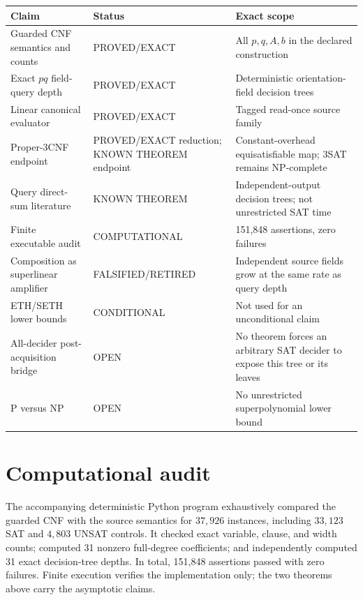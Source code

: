 \documentclass[11pt]{article}
\begin{document}
\begin{center}\small
\begin{tabular}{p{.27\linewidth}p{.24\linewidth}p{.35\linewidth}}
\toprule
Claim & Status & Exact scope\\\midrule
Guarded CNF semantics and counts & PROVED/EXACT & All $p,q,A,b$ in the declared construction\\
Exact $pq$ field-query depth & PROVED/EXACT & Deterministic orientation-field decision trees\\
Linear canonical evaluator & PROVED/EXACT & Tagged read-once source family\\
Proper-3CNF endpoint & PROVED/EXACT reduction; KNOWN THEOREM endpoint & Constant-overhead equisatisfiable map; 3SAT remains NP-complete\\
Query direct-sum literature & KNOWN THEOREM & Independent-output decision trees; not unrestricted SAT time\\
Finite executable audit & COMPUTATIONAL & 151,848 assertions, zero failures\\
Composition as superlinear amplifier & FALSIFIED/RETIRED & Independent source fields grow at the same rate as query depth\\
ETH/SETH lower bounds & CONDITIONAL & Not used for an unconditional claim\\
All-decider post-acquisition bridge & OPEN & No theorem forces an arbitrary SAT decider to expose this tree or its leaves\\
P versus NP & OPEN & No unrestricted superpolynomial lower bound\\
\bottomrule
\end{tabular}
\end{center}

\section{Computational audit}
The accompanying deterministic Python program exhaustively compared the
guarded CNF with the source semantics for $37{,}926$ instances, including
$33{,}123$ SAT and $4{,}803$ UNSAT controls.  It checked exact variable, clause,
and width counts; computed 31 nonzero full-degree coefficients; and independently
computed 31 exact decision-tree depths.  In total, 151,848 assertions passed
with zero failures.  Finite execution verifies the implementation only; the
two theorems above carry the asymptotic claims.
\end{document}
